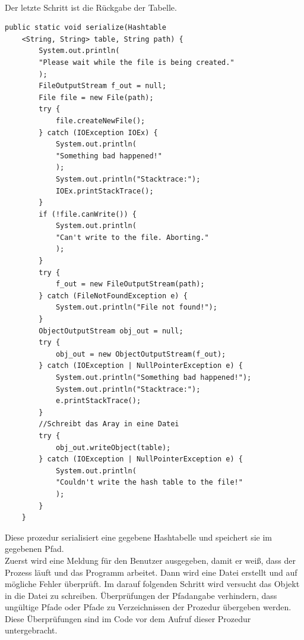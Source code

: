 \documentclass[11pt]{article}
\begin{document}
\\Der letzte Schritt ist die Rückgabe der Tabelle.
\begin{lstlisting}[caption=Algorithmus zur Serialisierung der Hashtabelle, label=lst:serializing]
    public static void serialize(Hashtable
    <String, String> table, String path) {
        System.out.println(
        "Please wait while the file is being created."
        );
        FileOutputStream f_out = null;
        File file = new File(path);
        try {
            file.createNewFile();
        } catch (IOException IOEx) {
            System.out.println(
            "Something bad happened!"
            );
            System.out.println("Stacktrace:");
            IOEx.printStackTrace();
        }
        if (!file.canWrite()) {
            System.out.println(
            "Can't write to the file. Aborting."
            );
        }
        try {
            f_out = new FileOutputStream(path);
        } catch (FileNotFoundException e) {
            System.out.println("File not found!");
        }
        ObjectOutputStream obj_out = null;
        try {
            obj_out = new ObjectOutputStream(f_out);
        } catch (IOException | NullPointerException e) {
            System.out.println("Something bad happened!");
            System.out.println("Stacktrace:");
            e.printStackTrace();
        }
        //Schreibt das Aray in eine Datei
        try {
            obj_out.writeObject(table);
        } catch (IOException | NullPointerException e) {
            System.out.println(
            "Couldn't write the hash table to the file!"
            );
        }
    }
\end{lstlisting}
Diese prozedur serialisiert eine gegebene Hashtabelle und speichert sie im gegebenen Pfad.\\
Zuerst wird eine Meldung für den Benutzer ausgegeben, damit er weiß, dass der Prozess läuft und das Programm arbeitet. Dann wird eine Datei erstellt und auf mögliche Fehler überprüft. Im darauf folgenden Schritt wird versucht das Objekt in die Datei zu schreiben. Überprüfungen der Pfadangabe verhindern, dass ungültige Pfade oder Pfade zu Verzeichnissen der Prozedur übergeben werden. Diese Überprüfungen sind im Code vor dem Aufruf dieser Prozedur untergebracht. 
\pagebreak
\end{document}
